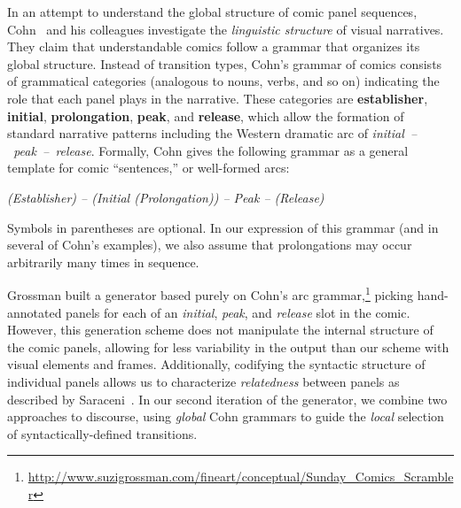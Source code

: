 In an attempt to understand the global structure of comic panel sequences,
Cohn~\cite{cohn2016visual} and his colleagues investigate the {\em linguistic structure} of
visual narratives. They claim that understandable comics follow a grammar
that organizes its global structure. Instead of transition types, Cohn's
grammar of comics consists of grammatical categories (analogous to nouns,
verbs, and so on) indicating the role that each panel plays in the
narrative. These categories are {\bf establisher}, {\bf initial}, {\bf
prolongation}, {\bf peak}, and {\bf release}, which allow the formation of
standard narrative patterns including the Western dramatic arc of 
\hbox{\em initial -- peak -- release}. Formally, Cohn gives the following grammar 
as a general template for comic ``sentences,'' or well-formed arcs:

{\it (Establisher) -- (Initial (Prolongation)) -- Peak -- (Release)}

\noindent Symbols in parentheses are optional. In our expression of this grammar (and
in several of Cohn's examples), we also assume that prolongations may occur
arbitrarily many times in sequence.

Grossman built a generator based purely on Cohn's arc grammar,\footnote{
  \url{http://www.suzigrossman.com/fineart/conceptual/Sunday_Comics_Scrambler}
}
picking hand-annotated panels for each of an {\em initial},
{\em peak}, and {\em release} slot in the comic. However, this generation
scheme does not manipulate the internal structure of the comic panels,
allowing for less variability in the output than our scheme with visual
elements and frames. Additionally, codifying the syntactic structure of
individual panels allows us to characterize {\em relatedness} between
panels as described by Saraceni~\cite{saraceni2016relatedness}. In our second
iteration of the generator, we combine two approaches to discourse, using
{\em global} Cohn grammars to guide the {\em local} selection of
syntactically-defined transitions.


